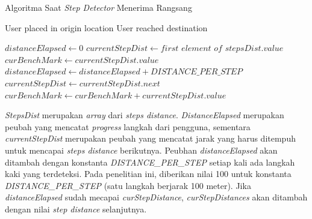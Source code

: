 \begin{algorithm}
	\caption{Algoritma Saat \textit{Step Detector} Menerima Rangsang}
	\label{alg:algoritma-step-detector}
	\begin{algorithmic}[1]
	\Require User placed in origin location	
	\Ensure User reached destination
	
		\State $distanceElapsed \gets 0$ 
		\State $currentStepDist \gets first$ $element$ $of$ $stepsDist.value$
		\State $curBenchMark \gets currentStepDist.value$
    		\State $distanceElapsed \gets distanceElapsed + DISTANCE\_PER\_STEP$
    			\State $currentStepDist \gets currentStepDist.next$    			
				\State $curBenchMark \gets curBenchMark + currentStepDist.value$
				
    			\EndIf
    		\EndIf
    	\EndIf
	\EndFunction  
	\end{algorithmic}
\end{algorithm}

\textit{StepsDist} merupakan \textit{array} dari \textit{steps distance}. \textit{DistanceElapsed} merupakan peubah yang mencatat \textit{progress} langkah dari pengguna, sementara \textit{currentStepDist} merupakan peubah yang mencatat jarak yang harus ditempuh untuk mencapai \textit{steps distance} berikutnya.
Peubhan \textit{distanceElapsed} akan ditambah dengan konstanta \textit{DISTANCE\_PER\_STEP} setiap kali ada langkah kaki yang terdeteksi. Pada penelitian ini, diberikan nilai 100 untuk konstanta \textit{DISTANCE\_PER\_STEP} (satu langkah berjarak 100 meter). 
Jika \textit{distanceElapsed} sudah mecapai \textit{curStepDistance}, \textit{curStepDistances} akan ditambah dengan nilai \textit{step distance} selanjutnya. 